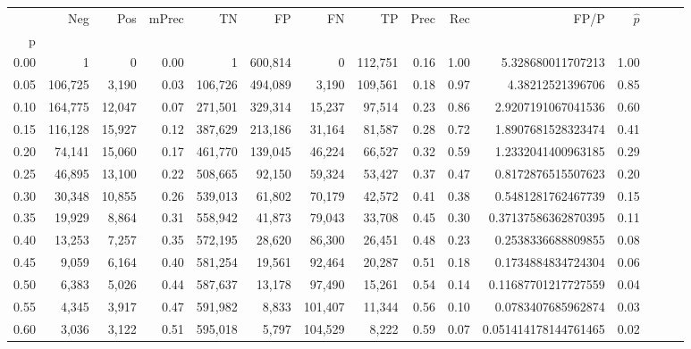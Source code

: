 \begin{tabular}{rrrrrrrrrrrrrrr}
\toprule
{} &      Neg &     Pos & mPrec &       TN &       FP &       FN &       TP &  Prec &   Rec &                    FP/P & $\hat{p}$ \\
p    &          &         &       &          &          &          &          &       &       &                         &           \\
\midrule
0.00 &        1 &       0 &  0.00 &        1 &  600,814 &        0 &  112,751 &  0.16 &  1.00 &       5.328680011707213 &      1.00 \\
0.05 &  106,725 &   3,190 &  0.03 &  106,726 &  494,089 &    3,190 &  109,561 &  0.18 &  0.97 &        4.38212521396706 &      0.85 \\
0.10 &  164,775 &  12,047 &  0.07 &  271,501 &  329,314 &   15,237 &   97,514 &  0.23 &  0.86 &      2.9207191067041536 &      0.60 \\
0.15 &  116,128 &  15,927 &  0.12 &  387,629 &  213,186 &   31,164 &   81,587 &  0.28 &  0.72 &      1.8907681528323474 &      0.41 \\
0.20 &   74,141 &  15,060 &  0.17 &  461,770 &  139,045 &   46,224 &   66,527 &  0.32 &  0.59 &      1.2332041400963185 &      0.29 \\
0.25 &   46,895 &  13,100 &  0.22 &  508,665 &   92,150 &   59,324 &   53,427 &  0.37 &  0.47 &      0.8172876515507623 &      0.20 \\
0.30 &   30,348 &  10,855 &  0.26 &  539,013 &   61,802 &   70,179 &   42,572 &  0.41 &  0.38 &      0.5481281762467739 &      0.15 \\
0.35 &   19,929 &   8,864 &  0.31 &  558,942 &   41,873 &   79,043 &   33,708 &  0.45 &  0.30 &     0.37137586362870395 &      0.11 \\
0.40 &   13,253 &   7,257 &  0.35 &  572,195 &   28,620 &   86,300 &   26,451 &  0.48 &  0.23 &      0.2538336688809855 &      0.08 \\
0.45 &    9,059 &   6,164 &  0.40 &  581,254 &   19,561 &   92,464 &   20,287 &  0.51 &  0.18 &      0.1734884834724304 &      0.06 \\
0.50 &    6,383 &   5,026 &  0.44 &  587,637 &   13,178 &   97,490 &   15,261 &  0.54 &  0.14 &     0.11687701217727559 &      0.04 \\
0.55 &    4,345 &   3,917 &  0.47 &  591,982 &    8,833 &  101,407 &   11,344 &  0.56 &  0.10 &      0.0783407685962874 &      0.03 \\
0.60 &    3,036 &   3,122 &  0.51 &  595,018 &    5,797 &  104,529 &    8,222 &  0.59 &  0.07 &    0.051414178144761465 &      0.02 \\

\end{tabular}
